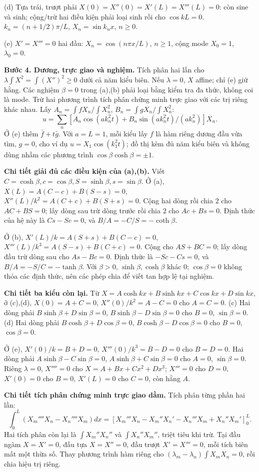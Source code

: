 (d) Tựa trái, trượt phải $X(0)=X''(0)=X'(L)=X'''(L)=0$: còn sine và sinh; cộng/trừ hai điều kiện phải loại sinh rồi cho $\cos kL=0$. $k_n=(n+1/2)\pi/L$, $X_n=\sin k_nx$, $n\ge0$.

(e) $X'=X'''=0$ hai đầu: $X_n=\cos(n\pi x/L)$, $n\ge1$, cộng mode $X_0=1$, $\lambda_0=0$.

\textbf{Bước 4. Dương, trực giao và nghiệm.} Tích phân hai lần cho $\lambda\int X^2=\int(X'')^2\ge0$ dưới cả năm kiểu biên. Nếu $\lambda=0$, $X$ affine; chỉ (e) giữ hằng. Các nghiệm $\beta=0$ trong (a),(b) phải loại bằng kiểm tra đa thức, không coi là mode. Trừ hai phương trình tích phân chứng minh trực giao với các trị riêng khác nhau. Lấy $A_n=\int fX_n/\int X_n^2$, $B_n=\int gX_n/\int X_n^2$:
\[u=\sum_n[A_n\cos(ak_n^2t)+B_n\sin(ak_n^2t)/(ak_n^2)]X_n.\]
Ở (e) thêm $\bar f+t\bar g$. Với $a=L=1$, mỗi kiểu lấy $f$ là hàm riêng dương đầu vừa tìm, $g=0$, cho ví dụ $u=X_1\cos(k_1^2t)$; đồ thị kèm đủ năm kiểu biên và không dùng nhầm các phương trình $\cos\beta\cosh\beta=\pm1$.

\textbf{Chi tiết giải đủ các điều kiện của (a),(b).} Viết $C=\cosh\beta,c=\cos\beta,S=\sinh\beta,s=\sin\beta$.
Ở (a), $X(L)=A(C-c)+B(S-s)=0$, $X''(L)/k^2=A(C+c)+B(S+s)=0$. Cộng hai dòng rồi chia $2$ cho $AC+BS=0$; lấy dòng sau trừ dòng trước rồi chia $2$ cho $Ac+Bs=0$. Định thức của hệ này là $Cs-Sc=0$, và $B/A=-C/S=-\coth\beta$.

Ở (b), $X'(L)/k=A(S+s)+B(C-c)=0$, $X'''(L)/k^3=A(S-s)+B(C+c)=0$. Cộng cho $AS+BC=0$; lấy dòng đầu trừ dòng sau cho $As-Bc=0$. Định thức là $-Sc-Cs=0$, và $B/A=-S/C=-\tanh\beta$. Với $\beta>0$, $\sinh\beta,\cosh\beta$ khác $0$; $\cos\beta=0$ không thỏa các định thức, nên các phép chia để viết tan hợp lệ tại nghiệm.

\textbf{Chi tiết ba kiểu còn lại.} Từ $X=A\cosh kx+B\sinh kx+C\cos kx+D\sin kx$, ở (c),(d), $X(0)=A+C=0$, $X''(0)/k^2=A-C=0$ cho $A=C=0$. (c) Hai dòng phải $B\sinh\beta+D\sin\beta=0$, $B\sinh\beta-D\sin\beta=0$ cho $B=0$, $\sin\beta=0$. (d) Hai dòng phải $B\cosh\beta+D\cos\beta=0$, $B\cosh\beta-D\cos\beta=0$ cho $B=0$, $\cos\beta=0$.

Ở (e), $X'(0)/k=B+D=0$, $X'''(0)/k^3=B-D=0$ cho $B=D=0$. Hai dòng phải $A\sinh\beta-C\sin\beta=0$, $A\sinh\beta+C\sin\beta=0$ cho $A=0$, $\sin\beta=0$. Riêng $\lambda=0$, $X''''=0$ cho $X=A+Bx+Cx^2+Dx^3$; $X'''=0$ cho $D=0$, $X'(0)=0$ cho $B=0$, $X'(L)=0$ cho $C=0$, còn hằng $A$.

\textbf{Chi tiết tích phân chứng minh trực giao dầm.} Tích phân từng phần hai lần:
\[\int_0^L(X_m''''X_n-X_n''''X_m)dx=
[X_m'''X_n-X_m''X_n'-X_n'''X_m+X_n''X_m']_0^L.\]
Hai tích phân còn lại là $\int X_m''X_n''$ và $\int X_n''X_m''$, triệt tiêu khi trừ. Tại đầu ngàm $X=X'=0$, đầu tựa $X=X''=0$, đầu trượt $X'=X'''=0$, mỗi tích biên mất một thừa số. Thay phương trình hàm riêng cho $(\lambda_m-\lambda_n)\int X_mX_n=0$, rồi chia hiệu trị riêng.

